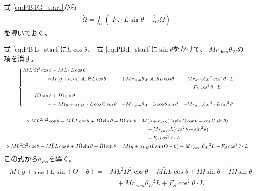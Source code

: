 \documentclass[a4paper,11pt]{jsarticle}
\begin{document}
式 \ref{eq:PB:IG_start}から
\begin{gather}
  \dot{\Omega} = 
  \left.\frac{1}{I_G}\middle(
    F_S \cdot L\sin\theta
    -\dot{I_G}\Omega
  \right)
  \label{eq:Omega}
\end{gather}
を導いておく。

式 \ref{eq:PB:L_start}に$L\cos\theta$、
式 \ref{eq:PB:I_start}に$\sin\theta$をかけて、
$Mr_{Arm}\ddot{\theta}_W$の項を消す。
\begin{gather}
  \left\{
  \begin{aligned}  
    ML^2\Omega^2 \cos\theta &- M\ddot{L} \cdot L \cos\theta
    &&&&
    \\
    =& M(g+a_{PB})\sin\Theta L\cos\theta
    &+& Mr_{arm}\ddot{\theta}_W\sin\theta L\cos\theta
    &-& Mr_{arm}\dot{\theta}_W{}^2\cos^2\theta \cdot L
    \\
    &&&&&- F_S\cos^2\theta \cdot L
    \\
    I\dot\Omega \sin\theta &+ \dot{I}\Omega \sin\theta
    &&&&
    \\
    =& -M(g+a_{PB}) \cdot L\cos\Theta \sin\theta
    &-& Mr_{arm}\ddot{\theta}_W \cdot L \cos\theta \sin\theta
    &-& Mr_{arm}\dot{\theta}_W{}^2 \cdot L \sin^2\theta
  \end{aligned}
  \right.
  \notag
  \\
  \quad \notag
  \\
  \begin{aligned}
    \Rightarrow
    ML^2\Omega^2 \cos\theta - M\ddot{L}L \cos\theta + I\dot\Omega \sin\theta + \dot{I}\Omega \sin\theta
    =& M(g+a_{PB}) L(\sin\Theta \cos\theta - \cos\Theta \sin\theta)
    \\
    &\quad - Mr_{Arm}L(\cos^2\theta + \sin^2\theta)
    \\
    &\quad - F_S\cos^2\theta \cdot L
  \end{aligned}
  \notag
  \\
  \Rightarrow
  ML^2\Omega^2 \cos\theta - M\ddot{L}L \cos\theta + I\dot\Omega \sin\theta + \dot{I}\Omega \sin\theta
  =
  M(g+a_{PB}) L\sin(\Theta - \theta) - Mr_{Arm}\dot{\theta}_W{}^2L - F_S\cos^2\theta \cdot L
  \notag
\end{gather}
この式から$a_{PB}$を導く。
\begin{align}
  \begin{aligned}
    M(g+a_{PB}) L\sin(\Theta - \theta)
    =&
    ML^2\Omega^2 \cos\theta - M\ddot{L}L \cos\theta + I\dot\Omega \sin\theta + \dot{I}\Omega \sin\theta
    \\
    &\quad + Mr_{Arm}\dot{\theta}_W{}^2L + F_S\cos^2\theta \cdot L
  \end{aligned}
\end{align}
\end{document}
